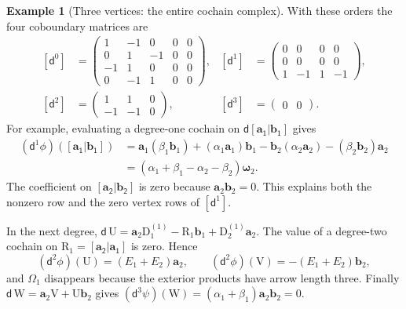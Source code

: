 \documentclass[a4paper,11pt,oneside,reqno]{amsart}
\theoremstyle{definition}
\newtheorem{example}[theorem]{Example}
\numberwithin{equation}{section}
\begin{document}
\begin{example}[Three vertices: the entire cochain complex]
		With these orders the four coboundary matrices are
		\begin{equation}\label{eq:m3-cochain-matrices}
			\begin{aligned}
				[\mathsf d^0]&=
				\begin{pmatrix}
					1&-1&0&0&0\\0&1&-1&0&0\\
					-1&1&0&0&0\\0&-1&1&0&0
				\end{pmatrix},&
				[\mathsf d^1]&=
				\begin{pmatrix}
					0&0&0&0\\0&0&0&0\\1&-1&1&-1
				\end{pmatrix},\\[2mm]
				[\mathsf d^2]&=
				\begin{pmatrix}1&1&0\\-1&-1&0\end{pmatrix},&
				[\mathsf d^3]&=\begin{pmatrix}0&0\end{pmatrix}.
			\end{aligned}
		\end{equation}
		For example, evaluating a degree-one cochain on $\mathsf d\mathsf{[\mathbf{a}_1|\mathbf{b}_1]}$ gives
		\[
		\begin{aligned}
			(\mathsf d^1\phi)(\mathsf{[\mathbf{a}_1|\mathbf{b}_1]})
			&=\mathbf{a}_1(\beta_1\mathbf{b}_1)+(\alpha_1\mathbf{a}_1)\mathbf{b}_1
			-\mathbf{b}_2(\alpha_2\mathbf{a}_2)-(\beta_2\mathbf{b}_2)\mathbf{a}_2\\
			&=(\alpha_1+\beta_1-\alpha_2-\beta_2)\boldsymbol{\omega}_2.
		\end{aligned}
		\]
		The coefficient on $\mathsf{[\mathbf{a}_2|\mathbf{b}_2]}$ is zero because $\mathbf{a}_2\mathbf{b}_2=0$.
		This explains both the nonzero row and the zero vertex rows of
		$[\mathsf d^1]$.
		
		In the next degree, $\mathsf d\,\mathrm{U}=\mathbf{a}_2\mathrm{D}_1^{(1)}-\mathrm{R}_1\mathbf{b}_1+\mathrm{D}_2^{(1)}\mathbf{a}_2$.
		The value of a degree-two cochain on $\mathrm{R}_1=\mathsf{[\mathbf{a}_2|\mathbf{a}_1]}$ is zero.  Hence
		\[
		(\mathsf d^2\phi)(\mathrm{U})=(E_1+E_2)\mathbf{a}_2,
		\qquad
		(\mathsf d^2\phi)(\mathrm{V})=-(E_1+E_2)\mathbf{b}_2,
		\]
		and $\Omega_1$ disappears because the exterior products have arrow
		length three.  Finally $\mathsf d\,\mathrm{W}=\mathbf{a}_2\mathrm{V}+\mathrm{U}\mathbf{b}_2$ gives
		$(\mathsf d^3\psi)(\mathrm{W})=(\alpha_1+\beta_1)\mathbf{a}_2\mathbf{b}_2=0$.
		

\end{example}
\end{document}
